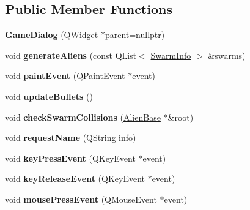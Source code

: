 \subsection*{Public Member Functions}
\begin{DoxyCompactItemize}
\item 
\mbox{\label{classgame_1_1GameDialog_ada855d83e0afdf329d108f5d081f0e34}} 
{\bfseries Game\+Dialog} (Q\+Widget $\ast$parent=nullptr)
\item 
\mbox{\label{classgame_1_1GameDialog_a34dffea7be3287484ba6e8d1860a6ee7}} 
void {\bfseries generate\+Aliens} (const Q\+List$<$ \hyperlink{classgame_1_1SwarmInfo}{Swarm\+Info} $>$ \&swarms)
\item 
\mbox{\label{classgame_1_1GameDialog_a13d8b21dbfdce1364bb66c237eb69ccb}} 
void {\bfseries paint\+Event} (Q\+Paint\+Event $\ast$event)
\item 
\mbox{\label{classgame_1_1GameDialog_addccb9ba0f81306a68a72363c8e6bdf0}} 
void {\bfseries update\+Bullets} ()
\item 
\mbox{\label{classgame_1_1GameDialog_af08670ba65279ac0de6f04c991b24c7b}} 
void {\bfseries check\+Swarm\+Collisions} (\hyperlink{classgame_1_1AlienBase}{Alien\+Base} $\ast$\&root)
\item 
\mbox{\label{classgame_1_1GameDialog_a4e6ebb0710ca0d0814e1c615ff7f9601}} 
void {\bfseries request\+Name} (Q\+String info)
\item 
\mbox{\label{classgame_1_1GameDialog_ad6d81a591bf8d475e7cdc3d628cec2bc}} 
void {\bfseries key\+Press\+Event} (Q\+Key\+Event $\ast$event)
\item 
\mbox{\label{classgame_1_1GameDialog_a83f78e6ff49bcdc7e7ebd34af9bd25c9}} 
void {\bfseries key\+Release\+Event} (Q\+Key\+Event $\ast$event)
\item 
\mbox{\label{classgame_1_1GameDialog_a7000081522bab10fed0f2b17562bdee0}} 
void {\bfseries mouse\+Press\+Event} (Q\+Mouse\+Event $\ast$event)

\end{DoxyCompactItemize}
